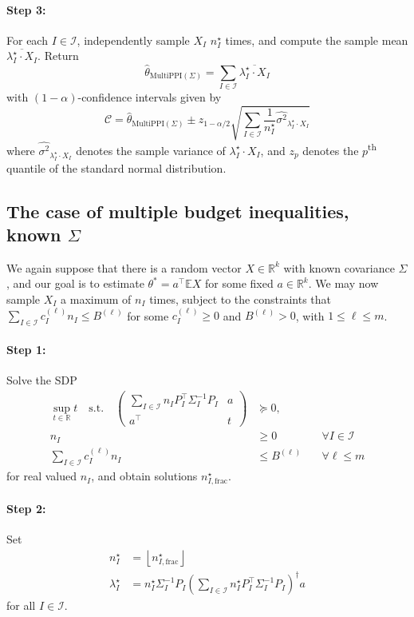 \documentclass{article} %
\newcommand{\R}{\mathbb{R}}
\newcommand{\Ex}{\mathbb{E}}
\begin{document}
\paragraph{Step 3:} For each $I\in\mathcal{I}$, independently sample $X_I$ $n^\star_I$ times, and compute the sample mean $\overline{\lambda^\star_I\cdot X_I}$. Return
\[
\hat{\theta}_{\text{MultiPPI}(\Sigma)} = \sum_{I\in\mathcal{I}} \overline{\lambda_I^\star \cdot X_I}
\]
with $(1-\alpha)$-confidence intervals given by
\[
\mathcal{C} = \hat{\theta}_{\text{MultiPPI}(\Sigma)} \pm z_{1-\alpha/2} \sqrt{\sum_{I\in\mathcal{I}} \frac{1}{n^\star_I} \widehat{\sigma^2}_{\lambda_I^\star \cdot X_I}}
\]
where $\widehat{\sigma^2}_{\lambda_I^\star \cdot X_I}$ denotes the sample variance of $\lambda_I^\star \cdot X_I$, and $z_p$ denotes the $p$\textsuperscript{th} quantile of the standard normal distribution.

\subsection{The case of multiple budget inequalities, known $\Sigma$}\label{sec:multi-budget-alg}
We again suppose that there is a random vector $X\in\R^k$ with known covariance $\Sigma$, and our goal is to estimate $\theta^*=a^\top \Ex X$ for some fixed $a\in\R^k$. We may now sample $X_I$ a maximum of $n_I$ times, subject to the constraints that $\sum_{I\in\mathcal{I}} c_I^{(\ell)}n_I\leq B^{(\ell)}$ for some $c_I^{(\ell)}\geq0$ and $B^{(\ell)}>0$, with $1\leq\ell\leq m$.

\paragraph{Step 1:} Solve the SDP
\begin{align*}
    \sup_{t\in\R} t \quad\text{s.t.}\quad \begin{pmatrix}
    \sum_{I\in\mathcal{I}} n_I P_I^\top \Sigma_I^{-1}P_I & a \\
    a^\top & t
\end{pmatrix} &\succeq0, \\
n_I &\geq0\quad&\forall I\in\mathcal{I} \\
\sum_{I\in\mathcal{I}}c_I^{(\ell)}n_I&\leq B^{(\ell)}\quad &\forall \ell\leq m
\end{align*}
for real valued $n_I$, and obtain solutions $n^\star_{I,\text{frac}}$.

\paragraph{Step 2:} Set
\begin{align*}
n^\star_I &= \left\lfloor n^\star_{I,\text{frac}}\right\rfloor \\    
\lambda^\star_I &= n^\star_I\Sigma_I^{-1} P_I \left(\sum_{I\in\mathcal{I}} n^\star_I P_I^\top \Sigma_I^{-1} P_I\right)^\dagger a
\end{align*}
for all $I\in\mathcal{I}$.
\end{document}
